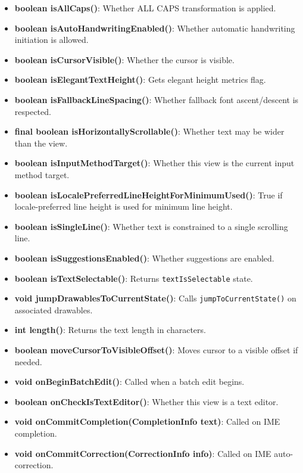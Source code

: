 \documentclass{report}
\begin{document}
\begin{itemize}
\begin{itemize}
                \item \textbf{boolean isAllCaps()}: Whether ALL CAPS transformation is applied.
                \item \textbf{boolean isAutoHandwritingEnabled()}: Whether automatic handwriting initiation is allowed.
                \item \textbf{boolean isCursorVisible()}: Whether the cursor is visible.
                \item \textbf{boolean isElegantTextHeight()}: Gets elegant height metrics flag.
                \item \textbf{boolean isFallbackLineSpacing()}: Whether fallback font ascent/descent is respected.
                \item \textbf{final boolean isHorizontallyScrollable()}: Whether text may be wider than the view.
                \item \textbf{boolean isInputMethodTarget()}: Whether this view is the current input method target.
                \item \textbf{boolean isLocalePreferredLineHeightForMinimumUsed()}: True if locale-preferred line height is used for minimum line height.
                \item \textbf{boolean isSingleLine()}: Whether text is constrained to a single scrolling line.
                \item \textbf{boolean isSuggestionsEnabled()}: Whether suggestions are enabled.
                \item \textbf{boolean isTextSelectable()}: Returns \texttt{textIsSelectable} state.
                \item \textbf{void jumpDrawablesToCurrentState()}: Calls \texttt{jumpToCurrentState()} on associated drawables.
                \item \textbf{int length()}: Returns the text length in characters.
                \item \textbf{boolean moveCursorToVisibleOffset()}: Moves cursor to a visible offset if needed.
                \item \textbf{void onBeginBatchEdit()}: Called when a batch edit begins.
                \item \textbf{boolean onCheckIsTextEditor()}: Whether this view is a text editor.
                \item \textbf{void onCommitCompletion(CompletionInfo text)}: Called on IME completion.
                \item \textbf{void onCommitCorrection(CorrectionInfo info)}: Called on IME auto-correction.

\end{itemize}
\end{itemize}
\end{document}
